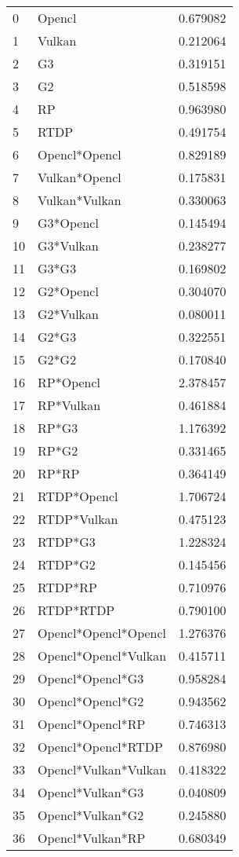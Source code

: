 \begin{tabular}{llr}
0 & Opencl & 0.679082 \\
1 & Vulkan & 0.212064 \\
2 & G3 & 0.319151 \\
3 & G2 & 0.518598 \\
4 & RP & 0.963980 \\
5 & RTDP & 0.491754 \\
6 & Opencl*Opencl & 0.829189 \\
7 & Vulkan*Opencl & 0.175831 \\
8 & Vulkan*Vulkan & 0.330063 \\
9 & G3*Opencl & 0.145494 \\
10 & G3*Vulkan & 0.238277 \\
11 & G3*G3 & 0.169802 \\
12 & G2*Opencl & 0.304070 \\
13 & G2*Vulkan & 0.080011 \\
14 & G2*G3 & 0.322551 \\
15 & G2*G2 & 0.170840 \\
16 & RP*Opencl & 2.378457 \\
17 & RP*Vulkan & 0.461884 \\
18 & RP*G3 & 1.176392 \\
19 & RP*G2 & 0.331465 \\
20 & RP*RP & 0.364149 \\
21 & RTDP*Opencl & 1.706724 \\
22 & RTDP*Vulkan & 0.475123 \\
23 & RTDP*G3 & 1.228324 \\
24 & RTDP*G2 & 0.145456 \\
25 & RTDP*RP & 0.710976 \\
26 & RTDP*RTDP & 0.790100 \\
27 & Opencl*Opencl*Opencl & 1.276376 \\
28 & Opencl*Opencl*Vulkan & 0.415711 \\
29 & Opencl*Opencl*G3 & 0.958284 \\
30 & Opencl*Opencl*G2 & 0.943562 \\
31 & Opencl*Opencl*RP & 0.746313 \\
32 & Opencl*Opencl*RTDP & 0.876980 \\
33 & Opencl*Vulkan*Vulkan & 0.418322 \\
34 & Opencl*Vulkan*G3 & 0.040809 \\
35 & Opencl*Vulkan*G2 & 0.245880 \\
36 & Opencl*Vulkan*RP & 0.680349 \\

\end{tabular}
